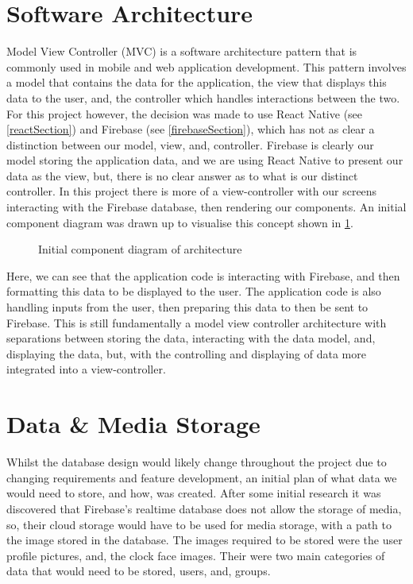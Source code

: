 \section{Software Architecture}
Model View Controller (MVC) \cite{mvc} is a software architecture pattern that is commonly used in mobile and web application development. This pattern involves a model that contains the data for the application, the view that displays this data to the user, and, the controller which handles interactions between the two. For this project however, the decision was made to use React Native (see \ref{reactSection}) and Firebase (see \ref{firebaseSection}), which has not as clear a distinction between our model, view, and, controller. Firebase is clearly our model storing the application data, and we are using React Native to present our data as the view, but, there is no clear answer as to what is our distinct controller. In this project there is more of a view-controller with our screens interacting with the Firebase database, then rendering our components. An initial component diagram was drawn up to visualise this concept shown in \ref{fig:compDiag}.
\begin{figure}[!htbp]
    \centering
    \begin{subfigure}[b]{0.6\textwidth}
    \end{subfigure}
    \caption{Initial component diagram of architecture} 
    \label{fig:compDiag}
\end{figure}
\FloatBarrier
Here, we can see that the application code is interacting with Firebase, and then formatting this data to be displayed to the user. The application code is also handling inputs from the user, then preparing this data to then be sent to Firebase. This is still fundamentally a model view controller architecture with separations between storing the data, interacting with the data model, and, displaying the data, but, with the controlling and displaying of data more integrated into a view-controller.

\section{Data \& Media Storage}\label{dataMedStor}
Whilst the database design would likely change throughout the project due to changing requirements and feature development, an initial plan of what data we would need to store, and how, was created. After some initial research it was discovered that Firebase's realtime database does not allow the storage of media, so, their cloud storage would have to be used for media storage, with a path to the image stored in the database. The images required to be stored were the user profile pictures, and, the clock face images. Their were two main categories of data that would need to be stored, users, and, groups.

